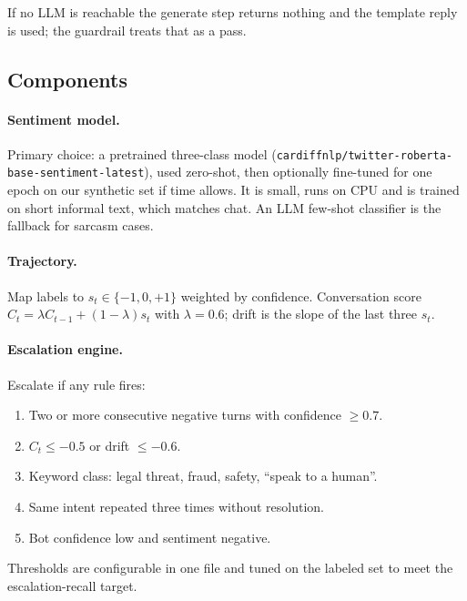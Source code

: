 \documentclass[11pt,a4paper]{article}
\begin{document}
\begin{center}
{}
\end{center}
\noindent If no LLM is reachable the generate step returns nothing and the template reply is used; the guardrail treats that as a pass.

\subsection{Components}
\paragraph{Sentiment model.} Primary choice: a pretrained three-class model (\texttt{cardiffnlp/twitter-roberta-base-sentiment-latest}), used zero-shot, then optionally fine-tuned for one epoch on our synthetic set if time allows. It is small, runs on CPU and is trained on short informal text, which matches chat. An LLM few-shot classifier is the fallback for sarcasm cases.

\paragraph{Trajectory.} Map labels to $s_t\in\{-1,0,+1\}$ weighted by confidence. Conversation score $C_t=\lambda C_{t-1}+(1-\lambda)s_t$ with $\lambda=0.6$; drift is the slope of the last three $s_t$.

\paragraph{Escalation engine.} Escalate if any rule fires:
\begin{enumerate}[label=R\arabic*.]
\item Two or more consecutive negative turns with confidence $\ge 0.7$.
\item $C_t \le -0.5$ or drift $\le -0.6$.
\item Keyword class: legal threat, fraud, safety, ``speak to a human''.
\item Same intent repeated three times without resolution.
\item Bot confidence low and sentiment negative.
\end{enumerate}
Thresholds are configurable in one file and tuned on the labeled set to meet the escalation-recall target.
\end{document}
